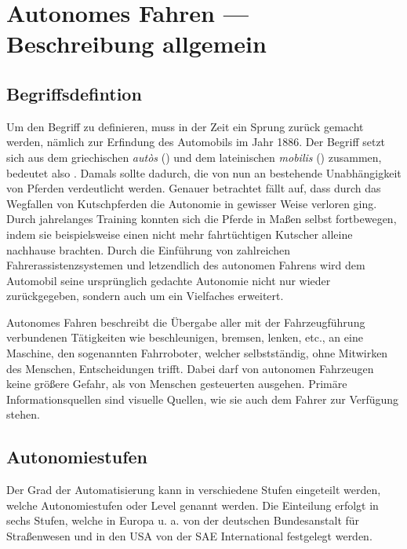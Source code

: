 \chapter{Autonomes Fahren --- Beschreibung allgemein}
\section{Begriffsdefintion}
Um den Begriff  zu definieren, muss in der Zeit ein Sprung zurück gemacht werden, nämlich zur Erfindung des Automobils im Jahr 1886. Der Begriff  setzt sich aus dem griechischen \textit{autòs} () und dem lateinischen \textit{mobilis} () zusammen, bedeutet also . Damals sollte dadurch, die von nun an bestehende Unabhängigkeit von Pferden verdeutlicht werden. Genauer betrachtet fällt auf, dass durch das Wegfallen von Kutschpferden die Autonomie in gewisser Weise verloren ging. Durch jahrelanges Training konnten sich die Pferde in Maßen selbst fortbewegen, indem sie beispielsweise einen nicht mehr fahrtüchtigen Kutscher alleine nachhause brachten.
Durch die Einführung von zahlreichen Fahrerassistenzsystemen und letzendlich des autonomen Fahrens wird dem Automobil seine ursprünglich gedachte Autonomie nicht nur wieder zurückgegeben, sondern auch um ein Vielfaches erweitert.

Autonomes Fahren beschreibt die Übergabe aller mit der Fahrzeugführung verbundenen Tätigkeiten wie beschleunigen, bremsen, lenken, etc., an eine Maschine, den sogenannten Fahrroboter, welcher selbstständig, ohne Mitwirken des Menschen, Entscheidungen trifft. Dabei darf von autonomen Fahrzeugen keine größere Gefahr, als von Menschen gesteuerten ausgehen. Primäre Informationsquellen sind visuelle Quellen, wie sie auch dem Fahrer zur Verfügung stehen.


\section{Autonomiestufen}
Der Grad der Automatisierung kann in verschiedene Stufen eingeteilt werden, welche Autonomiestufen oder Level genannt werden. Die Einteilung erfolgt in sechs Stufen, welche in Europa u. a. von der deutschen Bundesanstalt für Straßenwesen und in den USA von der SAE International festgelegt werden.



